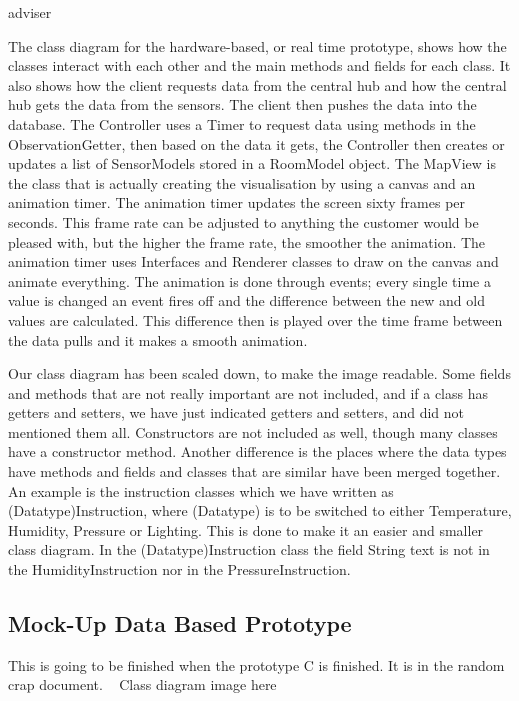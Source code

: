adviser\documentclass[../document]{subfiles}
\begin{document}
The class diagram for the hardware-based, or real time prototype, shows how the classes interact with each other and the main methods and fields for each class. It also shows how the client requests data from the central hub and how the central hub gets the data from the sensors. The client then pushes the data into the database. The Controller uses a Timer to request data using methods in the ObservationGetter, then based on the data it gets, the Controller then creates or updates a list of SensorModels stored in a RoomModel object. The MapView is the class that is actually creating the visualisation by using a canvas and an animation timer. The animation timer updates the screen sixty frames per seconds. This frame rate can be adjusted to anything the customer would be pleased with, but the higher the frame rate, the smoother the animation. The animation timer uses Interfaces and Renderer classes to draw on the canvas and animate everything. The animation is done through events; every single time a value is changed an event fires off and the difference between the new and old values are calculated. This difference then is played over the time frame between the data pulls and it makes a smooth animation. 

Our class diagram has been scaled down, to make the image readable. Some fields and methods that are not really important are not included, and if a class has getters and setters, we have just indicated getters and setters, and did not mentioned them all. Constructors are not included as well, though many classes have a constructor method. Another difference is the places where the data types have methods and fields and classes that are similar have been merged together. An example is the instruction classes which we have written as (Datatype)Instruction, where (Datatype) is to be switched to either Temperature, Humidity, Pressure or Lighting. This is done to make it an easier and smaller class diagram. In the (Datatype)Instruction class the field String text is not in the HumidityInstruction nor in the PressureInstruction.

\subsection{Mock-Up Data Based Prototype}

{\color{red}This is going to be finished when the prototype C is finished. It is in the random crap document.}
\newline \ \newline
{\color{red}Class diagram image here}
\end{document}
